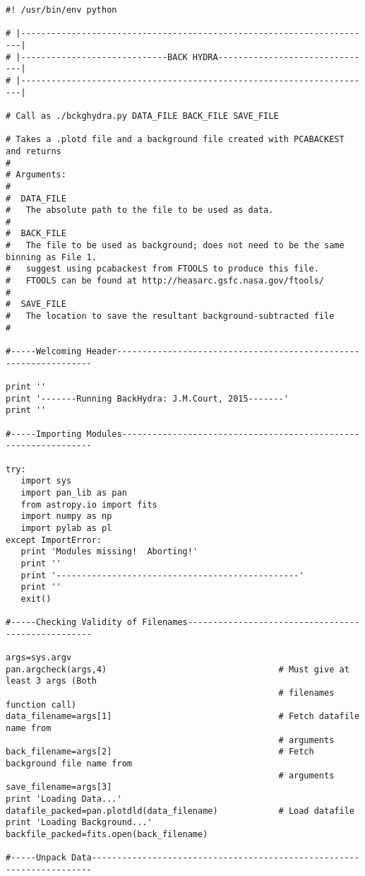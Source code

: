 \begin{verbatim}
#! /usr/bin/env python

# |----------------------------------------------------------------------|
# |-----------------------------BACK HYDRA-------------------------------|
# |----------------------------------------------------------------------|

# Call as ./bckghydra.py DATA_FILE BACK_FILE SAVE_FILE

# Takes a .plotd file and a background file created with PCABACKEST and returns
#
# Arguments:
#
#  DATA_FILE
#   The absolute path to the file to be used as data.
#
#  BACK_FILE
#   The file to be used as background; does not need to be the same binning as File 1.
#   suggest using pcabackest from FTOOLS to produce this file.
#   FTOOLS can be found at http://heasarc.gsfc.nasa.gov/ftools/
#
#  SAVE_FILE
#   The location to save the resultant background-subtracted file
#

#-----Welcoming Header-----------------------------------------------------------------

print ''
print '-------Running BackHydra: J.M.Court, 2015-------'
print ''

#-----Importing Modules----------------------------------------------------------------

try:
   import sys
   import pan_lib as pan
   from astropy.io import fits
   import numpy as np
   import pylab as pl
except ImportError:
   print 'Modules missing!  Aborting!'
   print ''
   print '------------------------------------------------'
   print ''
   exit()

#-----Checking Validity of Filenames---------------------------------------------------

args=sys.argv
pan.argcheck(args,4)                                  # Must give at least 3 args (Both
                                                      # filenames function call)
data_filename=args[1]                                 # Fetch datafile name from
                                                      # arguments
back_filename=args[2]                                 # Fetch background file name from
                                                      # arguments
save_filename=args[3]
print 'Loading Data...'
datafile_packed=pan.plotdld(data_filename)            # Load datafile
print 'Loading Background...'
backfile_packed=fits.open(back_filename)

#-----Unpack Data----------------------------------------------------------------------


\end{verbatim}
